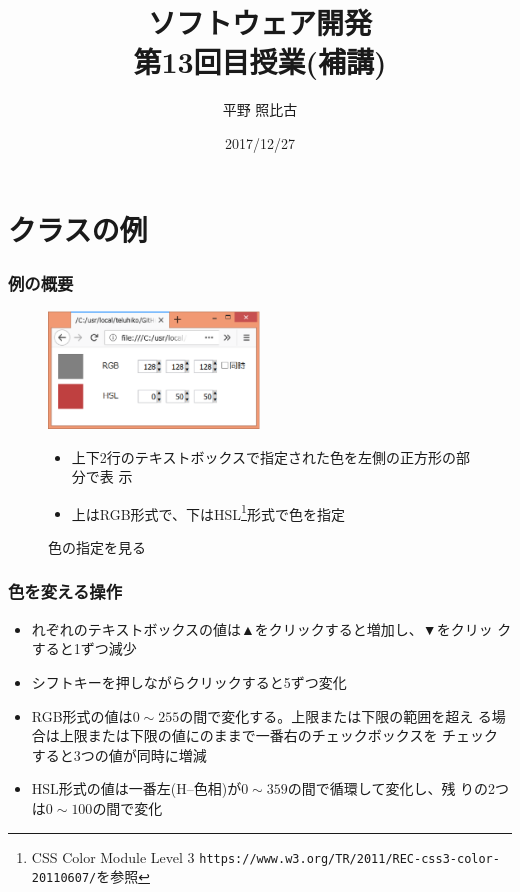 
\title{ソフトウェア開発\\第13回目授業(補講)}
\author{平野 照比古}
\institute{}
\date{2017/12/27}
\newtheorem{Prob}{解説}
\newcommand{\Elm}[1]{\texttt{<#1>}}

\newcommand{\DOMM}{\texttt}
\newcommand{\Event}{\texttt}
\newcommand{\DOMP}{\texttt}
\newcommand{\DOM}{\texttt{DOM}}
\newcommand{\keyitem}{\relax}
\newcommand{\HTML}{HTML文書}

\frame{\maketitle}
\section{クラスの例}
 \begin{frame}[containsverbatim]
  \frametitle{例の概要}
\begin{figure}[ht]
 \begin{center}
  \includegraphics[width=0.5\textwidth]{../13Ex.eps}
 \end{center}
 \caption{色の指定を見る}\label{color}
 \begin{itemize}
  \item 上下2行のテキストボックスで指定された色を左側の正方形の部分で表
        示
  \item 上はRGB形式で、下はHSL\footnote{CSS Color Module Level
3 \texttt{https://www.w3.org/TR/2011/REC-css3-color-20110607/}を参照}形式で色を指定
 \end{itemize}
\end{figure}
 \end{frame}
 \begin{frame}[containsverbatim]
  \frametitle{色を変える操作}
  \begin{itemize}
   \item れぞれのテキストボックスの値は▲をクリックすると増加し、▼をクリッ
       クすると1ずつ減少
   \item シフトキーを押しながらクリックすると5ずつ変化
   \item RGB形式の値は$0\sim255$の間で変化する。上限または下限の範囲を超え
       る場合は上限または下限の値にのままで一番右のチェックボックスを
       チェックすると3つの値が同時に増減
   \item HSL形式の値は一番左(H--色相)が$0\sim359$の間で循環して変化し、残
       りの2つは$0\sim100$の間で変化
  \end{itemize}
 \end{frame}

